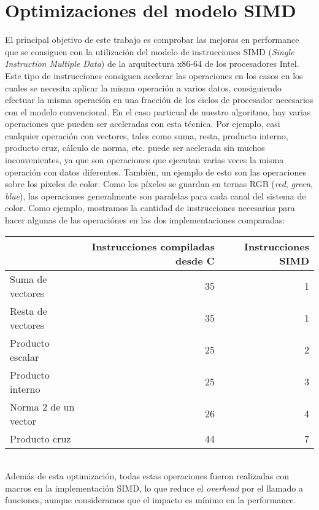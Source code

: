 \section{Optimizaciones del modelo SIMD}

El principal objetivo de este trabajo es comprobar las mejoras en performance que se consiguen con la utilización del modelo de instrucciones SIMD (\emph{Single Instruction Multiple Data}) de la arquitectura x86-64 de los procesadores Intel. Este tipo de instrucciones consiguen acelerar las operaciones en los casos en los cuales se necesita aplicar la misma operación a varios datos, consiguiendo efectuar la misma operación en una fracción de los ciclos de procesador necesarios con el modelo convencional. En el caso particual de nuestro algoritmo, hay varias operaciones que pueden ser aceleradas con esta técnica. Por ejemplo, casi cualquier operación con vectores, tales como suma, resta, producto interno, producto cruz, cálculo de norma, etc. puede ser acelerada sin muchos inconvenientes, ya que son operaciones que ejecutan varias veces la misma operación con datos diferentes. También, un ejemplo de esto son las operaciones sobre los píxeles de color. Como los píxeles se guardan en ternas RGB (\emph{red}, \emph{green}, \emph{blue}), las operaciones generalmente son paralelas para cada canal del sistema de color. Como ejemplo, mostramos la cantidad de instrucciones necesarias para hacer algunas de las operaciónes en las dos implementaciones comparadas:\\

{\center
\begin{tabular}[H]{l|r|r}
& Instrucciones compiladas desde C & Instrucciones SIMD\\\hline
Suma de vectores & 35 & 1 \\
Resta de vectores & 35 & 1\\
Producto escalar & 25 & 2\\
Producto interno & 25 & 3\\
Norma 2 de un vector & 26 & 4\\
Producto cruz & 44 & 7\\
\end{tabular}
}\\[1cm]

Además de esta optimización, todas estas operaciones fueron realizadas con macros en la implementación SIMD, lo que reduce el \emph{overhead} por el llamado a funciones, aunque consideramos que el impacto es mínimo en la performance.